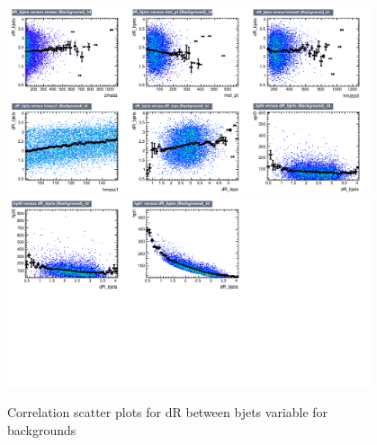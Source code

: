 \begin{figure}[!htb]%
\centering
\includegraphics[width=0.95\textwidth]{figures/CRTT/dataset/plots/correlationscatter_dR_bjets__Id_c3.pdf}
\includegraphics[width=0.95\textwidth]{figures/CRTT/dataset/plots/correlationscatter_dR_bjets__Id_c4.pdf}
\caption{ Correlation scatter plots for dR between bjets variable for backgrounds}%
\label{fig:correlations_CRTT_drbjets_BG}                                                       
\end{figure}




